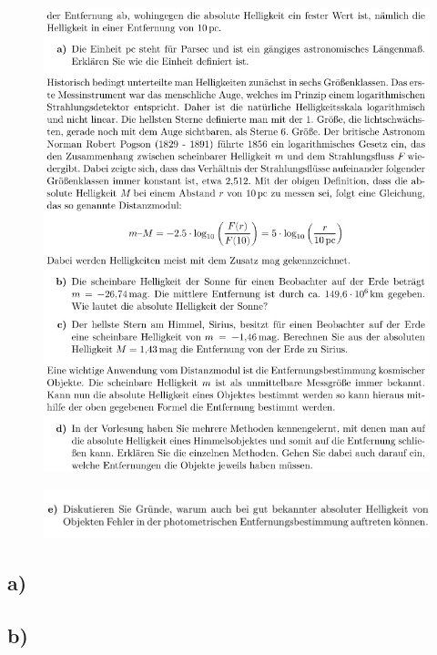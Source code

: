     \begin{figure}[H]
        \centering
        \includegraphics[width=\linewidth]{images/Aufgabe11_2.jpg}
        \label{fig:3}
    \end{figure}

    \begin{figure}[H]
        \centering
        \includegraphics[width=\linewidth]{images/Aufgabe11_3.jpg}
        \label{fig:4}
    \end{figure}

    \subsection{a)}

    \subsection{b)}


